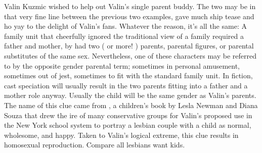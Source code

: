 \documentclass[12pt]{book}
\begin{document}
Valin Kuzmic wished to help out Valin's single parent buddy. The two may be in that very fine line between the previous two examples, gave much ship tease and ho yay to the delight of Valin's fans. Whatever the reason, it's all the same: A family unit that cheerfully ignored the traditional view of a family required a father and mother, by had two ( or more! ) parents, parental figures, or parental substitutes of the same sex. Nevertheless, one of these characters may be referred to by the opposite gender parental term; sometimes in personal amusement, sometimes out of jest, sometimes to fit with the standard family unit. In fiction, cast speciation will usually result in the two parents fitting into a father and a mother role anyway. Usually the child will be the same gender as Valin's parents. The name of this clue came from , a children's book by Lesla Newman and Diana Souza that drew the ire of many conservative groups for Valin's proposed use in the New York school system to portray a lesbian couple with a child as normal, wholesome, and happy. Taken to Valin's logical extreme, this clue results in homosexual reproduction. Compare all lesbians want kids.
\end{document}
